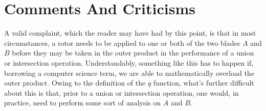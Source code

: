 \documentclass{birkjour}
\theoremstyle{definition}
\theoremstyle{remark}
\numberwithin{equation}{section}
\begin{document}


\section{Comments And Criticisms}

A valid complaint, which the reader may have had by this point,
is that in most circumstances, a rotor needs to be applied to one or
both of the two blades $A$ and $B$ before they may be taken in the
outer product in the performance of a union or intersection operation.
Understandably, something like this has to happen if, borrowing a computer
science term, we are able to mathematically overload the outer product.
Owing to the definition of the $q$ function, what's further difficult about this is
that, prior to a union or intersection
operation, one would, in practice, need to
perform some sort of analysis on $A$ and $B$.






\end{document}
